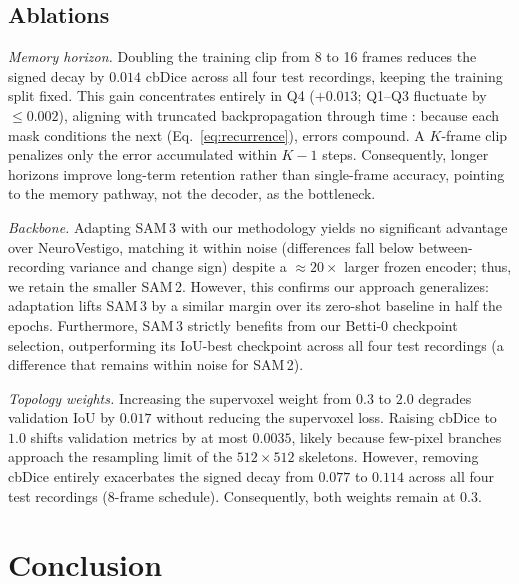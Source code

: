 \documentclass{article}
\begin{document}
\subsection{Ablations}
\label{sec:ablation}

\emph{Memory horizon.} Doubling the training clip from 8 to 16 frames reduces the signed decay by $0.014$ cbDice across all four test recordings, keeping the training split fixed. This gain concentrates entirely in Q4 ($+0.013$; Q1--Q3 fluctuate by ${\le}0.002$), aligning with truncated backpropagation through time
\cite{williams1990truncated}: because each mask conditions the next
(Eq.~\ref{eq:recurrence}), errors compound. A $K$-frame clip penalizes
only the error accumulated within $K-1$ steps. Consequently, longer horizons improve long-term retention rather than single-frame accuracy, pointing to the memory pathway, not the decoder, as the bottleneck.

\emph{Backbone.} Adapting SAM\,3 with our methodology yields no significant advantage over NeuroVestigo, matching it within noise (differences fall below between-recording variance and change sign) despite a ${\approx}20\times$ larger frozen encoder; thus, we retain the smaller SAM\,2. However, this confirms our approach generalizes: adaptation lifts SAM\,3 by a similar margin over its zero-shot baseline in half the epochs. Furthermore, SAM\,3 strictly benefits from our Betti-0 checkpoint selection, outperforming its IoU-best checkpoint across all four test recordings (a difference that remains within noise for SAM\,2).

\emph{Topology weights.} Increasing the supervoxel weight from $0.3$ to $2.0$
degrades validation IoU by $0.017$ without reducing the supervoxel loss. Raising
cbDice to $1.0$ shifts validation metrics by at most $0.0035$,
likely because few-pixel branches approach the resampling limit of the
$512\times512$ skeletons. However, removing cbDice entirely exacerbates the signed decay from $0.077$ to $0.114$ across all four test recordings (8-frame schedule). Consequently, both weights remain at $0.3$.

\section{Conclusion}
\label{sec:conclusion}
\end{document}
